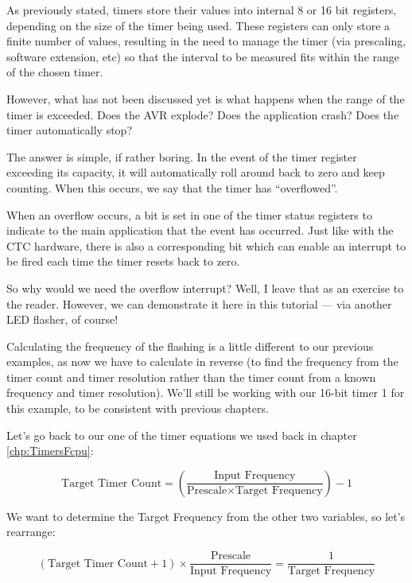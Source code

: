 \documentclass[a4paper,oneside,notitlepage]{book}
\begin{document}
As previously stated, timers store their values into internal 8 or 16 bit registers, depending on the size of the timer being used. These registers can only store a finite number of values, resulting in the need to manage the timer (via prescaling, software extension, etc) so that the interval to be measured fits within the range of the chosen timer.

However, what has not been discussed yet is what happens when the range of the timer is exceeded. Does the AVR explode? Does the application crash? Does the timer automatically stop?

The answer is simple, if rather boring. In the event of the timer register exceeding its capacity, it will automatically roll around back to zero and keep counting. When this occurs, we say that the timer has ``overflowed''.

When an overflow occurs, a bit is set in one of the timer status registers to indicate to the main application that the event has occurred. Just like with the CTC hardware, there is also a corresponding bit which can enable an interrupt to be fired each time the timer resets back to zero.

So why would we need the overflow interrupt? Well, I leave that as an exercise to the reader. However, we can demonstrate it here in this tutorial --- via another LED flasher, of course!

Calculating the frequency of the flashing is a little different to our previous examples, as now we have to calculate in reverse (to find the frequency from the timer count and timer resolution rather than the timer count from a known frequency and timer resolution). We'll still be working with our 16-bit timer 1 for this example, to be consistent with previous chapters.

Let's go back to our one of the timer equations we used back in chapter \ref{chp:TimersFcpu}:

\begin{displaymath}
\text{Target Timer Count} = (\frac{\text{Input Frequency}}{\text{Prescale} \times \text{Target Frequency}}) - 1
\end{displaymath}

We want to determine the Target Frequency from the other two variables, so let's rearrange:

\begin{displaymath}
(\text{Target Timer Count} + 1) \times \frac{\text{Prescale}}{\text{Input Frequency}} = \frac{1}{\text{Target Frequency}}
\end{displaymath}
\end{document}
